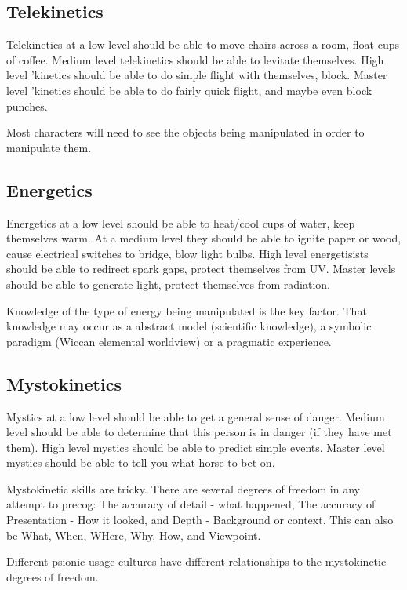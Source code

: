 \documentclass{book}
\begin{document}
\subsection{Telekinetics}

Telekinetics at a low level should be able to move chairs across a room, 
float cups of coffee. Medium level telekinetics should be able to levitate 
themselves. High level 'kinetics should be able to do simple flight
with themselves, block. Master level 'kinetics should be able to 
do fairly quick flight, and maybe even block punches.

Most characters will need to see the objects being manipulated in order
to manipulate them.

\subsection{Energetics}

Energetics at a low level should be able to heat/cool cups of water,
keep themselves warm. At a medium level they should be able to ignite
paper or wood, cause electrical switches to bridge, blow light bulbs.
High level energetisists should be able to redirect
spark gaps, protect themselves from UV. Master levels should be able to 
generate light, protect themselves from radiation.

Knowledge of the type of energy being manipulated is the key factor.
That knowledge may occur as a abstract model (scientific knowledge), a
symbolic paradigm (Wiccan elemental worldview) or a pragmatic experience.

\subsection{Mystokinetics}

Mystics at a low level should be able to get a general sense of danger.
Medium level should be able to determine that this person is in 
danger (if they have met them). High level mystics should be able to 
predict simple events. Master level mystics should be able to tell 
you what horse to bet on.


Mystokinetic skills are tricky. There are several degrees of freedom
in any attempt to precog: The accuracy of detail - what happened, The
accuracy of Presentation - How it looked, and Depth - Background or
context. This can also be What, When, WHere, Why, How, and Viewpoint.

Different psionic usage cultures have different relationships to the
mystokinetic degrees of freedom. 
\end{document}
